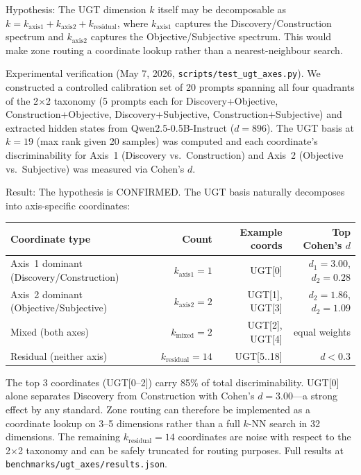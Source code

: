 \documentclass[11pt]{article}
\begin{document}
Hypothesis: The UGT dimension $k$ itself may be decomposable as $k = k_{\text{axis1}} + k_{\text{axis2}} + k_{\text{residual}}$, where $k_{\text{axis1}}$ captures the Discovery/Construction spectrum and $k_{\text{axis2}}$ captures the Objective/Subjective spectrum. This would make zone routing a coordinate lookup rather than a nearest-neighbour search.

Experimental verification (May 7, 2026, \texttt{scripts/test\_ugt\_axes.py}). We constructed a controlled calibration set of 20 prompts spanning all four quadrants of the 2$\times$2 taxonomy (5 prompts each for Discovery+Objective, Construction+Objective, Discovery+Subjective, Construction+Subjective) and extracted hidden states from Qwen2.5-0.5B-Instruct ($d{=}896$). The UGT basis at $k{=}19$ (max rank given 20 samples) was computed and each coordinate's discriminability for Axis~1 (Discovery vs.\ Construction) and Axis~2 (Objective vs.\ Subjective) was measured via Cohen's $d$.

Result: The hypothesis is CONFIRMED. The UGT basis naturally decomposes into axis-specific coordinates:

\begin{center}
\begin{tabular}{lrrr}
\toprule
Coordinate type & Count & Example coords & Top Cohen's $d$ \\
\midrule
Axis~1 dominant (Discovery/Construction) & $k_{\text{axis1}} = 1$ & UGT[0] & $d_1{=}3.00$, $d_2{=}0.28$ \\
Axis~2 dominant (Objective/Subjective)   & $k_{\text{axis2}} = 2$ & UGT[1], UGT[3] & $d_2{=}1.86$, $d_2{=}1.09$ \\
Mixed (both axes)                        & $k_{\text{mixed}} = 2$ & UGT[2], UGT[4] & equal weights \\
Residual (neither axis)                  & $k_{\text{residual}} = 14$ & UGT[5..18] & $d < 0.3$ \\
\bottomrule
\end{tabular}
\end{center}

The top 3 coordinates (UGT[0--2]) carry 85\% of total discriminability. UGT[0] alone separates Discovery from Construction with Cohen's $d{=}3.00$---a strong effect by any standard. Zone routing can therefore be implemented as a coordinate lookup on 3--5 dimensions rather than a full $k$-NN search in 32 dimensions. The remaining $k_{\text{residual}}{=}14$ coordinates are noise with respect to the 2$\times$2 taxonomy and can be safely truncated for routing purposes. Full results at \texttt{benchmarks/ugt\_axes/results.json}.\\
\end{document}
